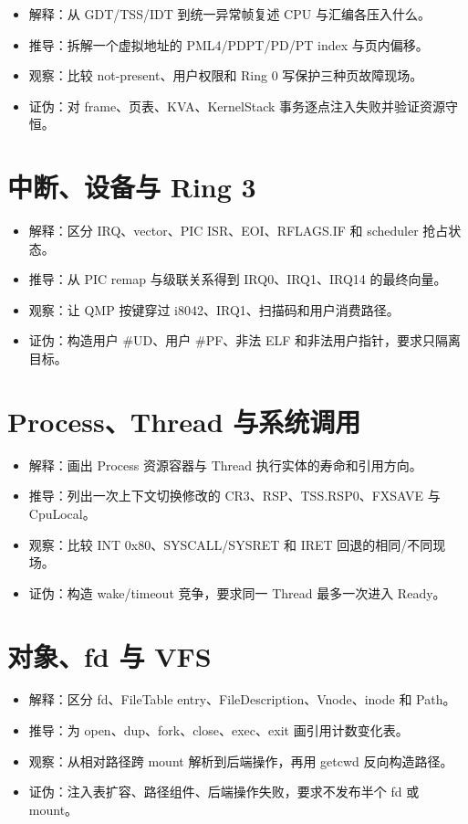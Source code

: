 \begin{itemize}
  \item 解释：从 GDT/TSS/IDT 到统一异常帧复述 CPU 与汇编各压入什么。
  \item 推导：拆解一个虚拟地址的 PML4/PDPT/PD/PT index 与页内偏移。
  \item 观察：比较 not-present、用户权限和 Ring 0 写保护三种页故障现场。
  \item 证伪：对 frame、页表、KVA、KernelStack 事务逐点注入失败并验证资源守恒。
\end{itemize}

\section*{中断、设备与 Ring 3}

\begin{itemize}
  \item 解释：区分 IRQ、vector、PIC ISR、EOI、RFLAGS.IF 和 scheduler 抢占状态。
  \item 推导：从 PIC remap 与级联关系得到 IRQ0、IRQ1、IRQ14 的最终向量。
  \item 观察：让 QMP 按键穿过 i8042、IRQ1、扫描码和用户消费路径。
  \item 证伪：构造用户 \#UD、用户 \#PF、非法 ELF 和非法用户指针，要求只隔离目标。
\end{itemize}

\section*{Process、Thread 与系统调用}

\begin{itemize}
  \item 解释：画出 Process 资源容器与 Thread 执行实体的寿命和引用方向。
  \item 推导：列出一次上下文切换修改的 CR3、RSP、TSS.RSP0、FXSAVE 与 CpuLocal。
  \item 观察：比较 INT 0x80、SYSCALL/SYSRET 和 IRET 回退的相同/不同现场。
  \item 证伪：构造 wake/timeout 竞争，要求同一 Thread 最多一次进入 Ready。
\end{itemize}

\section*{对象、fd 与 VFS}

\begin{itemize}
  \item 解释：区分 fd、FileTable entry、FileDescription、Vnode、inode 和 Path。
  \item 推导：为 open、dup、fork、close、exec、exit 画引用计数变化表。
  \item 观察：从相对路径跨 mount 解析到后端操作，再用 getcwd 反向构造路径。
  \item 证伪：注入表扩容、路径组件、后端操作失败，要求不发布半个 fd 或 mount。
\end{itemize}

